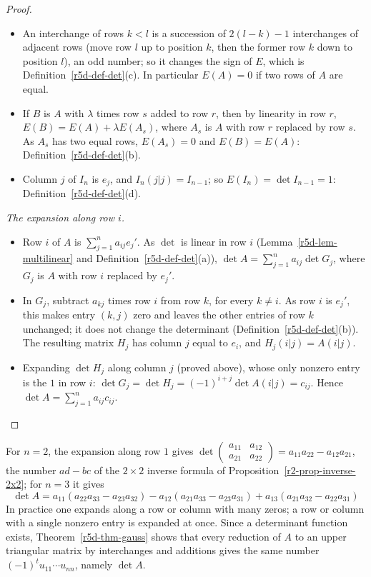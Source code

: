 \documentclass[12pt]{article}
\theoremstyle{definition}
\begin{document}
\begin{proof}
\begin{itemize}
\(0=E(u+v,u+v)=E(u,u)+E(u,v)+E(v,u)+E(v,v)=E(u,v)+E(v,u)\).
\item An interchange of rows \(k<l\) is a succession of \(2(l-k)-1\) interchanges of adjacent rows (move row \(l\) up
to position \(k\), then the former row \(k\) down to position \(l\)), an odd number; so it changes the sign of
\(E\), which is Definition~\ref{r5d-def-det}(c). In particular \(E(A)=0\) if two rows of \(A\) are equal.
\item If \(B\) is \(A\) with \(\lambda\) times row \(s\) added to row \(r\), then by linearity in row \(r\),
\(E(B)=E(A)+\lambda E(A_s)\), where \(A_s\) is \(A\) with row \(r\) replaced by row \(s\). As \(A_s\) has two equal rows,
\(E(A_s)=0\) and \(E(B)=E(A)\): Definition~\ref{r5d-def-det}(b).
\item Column \(j\) of \(I_n\) is \(e_j\), and \(I_n(j|j)=I_{n-1}\); so \(E(I_n)=\det I_{n-1}=1\):
Definition~\ref{r5d-def-det}(d).
\end{itemize}
\textit{The expansion along row \(i\).}
\begin{itemize}
\item Row \(i\) of \(A\) is \(\sum_{j=1}^na_{ij}e_j'\). As \(\det\) is linear in row \(i\) (Lemma~\ref{r5d-lem-multilinear} and
Definition~\ref{r5d-def-det}(a)), \(\det A=\sum_{j=1}^na_{ij}\det G_j\), where \(G_j\) is \(A\) with row \(i\) replaced by
\(e_j'\).
\item In \(G_j\), subtract \(a_{kj}\) times row \(i\) from row \(k\), for every \(k\ne i\). As row \(i\) is \(e_j'\), this makes
entry \((k,j)\) zero and leaves the other entries of row \(k\) unchanged; it does not change the determinant
(Definition~\ref{r5d-def-det}(b)). The resulting matrix \(H_j\) has column \(j\) equal to \(e_i\), and \(H_j(i|j)=A(i|j)\).
\item Expanding \(\det H_j\) along column \(j\) (proved above), whose only nonzero entry is the \(1\) in row \(i\):
\(\det G_j=\det H_j=(-1)^{i+j}\det A(i|j)=c_{ij}\). Hence \(\det A=\sum_{j=1}^na_{ij}c_{ij}\).\qedhere
\end{itemize}
\end{proof}
For \(n=2\), the expansion along row \(1\) gives
\(\det\left(\begin{smallmatrix}a_{11}&a_{12}\\a_{21}&a_{22}\end{smallmatrix}\right)=a_{11}a_{22}-a_{12}a_{21}\), the number \(ad-bc\)
of the \(2\times2\) inverse formula of Proposition~\ref{r2-prop-inverse-2x2}; for \(n=3\) it gives
\[
\det A=a_{11}(a_{22}a_{33}-a_{23}a_{32})-a_{12}(a_{21}a_{33}-a_{23}a_{31})+a_{13}(a_{21}a_{32}-a_{22}a_{31})
\]
In practice one expands along a row or column with many zeros; a row or column with a single nonzero entry is
expanded at once. Since a determinant function exists, Theorem~\ref{r5d-thm-gauss} shows that every reduction of \(A\) to
an upper triangular matrix by interchanges and additions gives the same number \((-1)^tu_{11}\cdots u_{nn}\), namely
\(\det A\).
\end{document}
